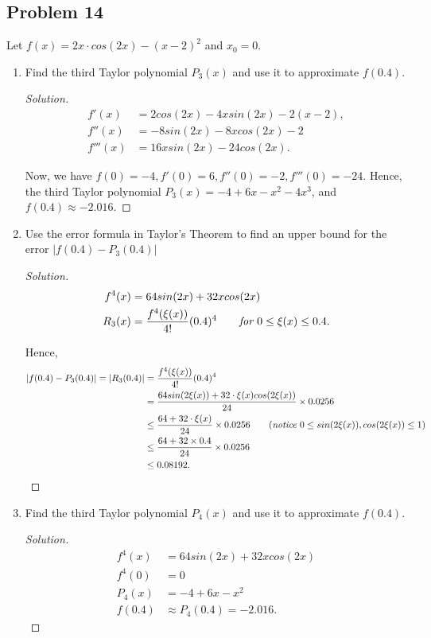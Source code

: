 \documentclass{article}
\begin{document}
\subsection*{Problem 14}
Let $f(x) = 2x\cdot cos(2x) - (x-2)^2$ and $x_0 = 0$.
\begin{enumerate}[label=(\alph*)]
    \item Find the third Taylor polynomial $P_3(x)$ and use it to approximate $f(0.4)$.
    \begin{proof}[Solution]
        \begin{align*}
            f'(x) & = 2cos(2x) - 4xsin(2x) - 2(x-2), \\
            f''(x) & = -8sin(2x) - 8xcos(2x) - 2 \\
            f'''(x) & = 16xsin(2x) - 24cos(2x).
        \end{align*}

        Now, we have $f(0) = -4, f'(0) = 6, f''(0) = -2, f'''(0) = -24$. Hence, the third Taylor 
        polynomial $P_3(x) = -4 + 6x -x^2 -4x^3$, and $f(0.4) \approx -2.016$.
    \end{proof}

    \item Use the error formula in Taylor's Theorem to find an upper bound for the error 
    $|f(0.4) - P_3(0.4)|$

    \begin{proof}[Solution]
        \begin{align*}
            f^4(x) & = 64sin(2x) + 32xcos(2x) \\
            R_3(x) & = \frac{f^4(\xi(x))}{4!}(0.4)^4 \qquad \emph{for } 0 \le \xi(x) \le 0.4.
        \end{align*}

        Hence, \begin{align*}
            |f(0.4) - P_3(0.4)| = |R_3(0.4)| & = \frac{f^4(\xi(x))}{4!}(0.4)^4 \\
            & = \frac{64sin(2\xi(x))+32\cdot \xi(x)cos(2\xi(x))}{24}\times 0.0256 \\
            & \le \frac{64+32\cdot \xi(x)}{24}\times 0.0256 \qquad (\emph{notice } 0 \le sin(2\xi(x)),
            cos(2\xi(x))\le 1)\\
            & \le \frac{64 + 32\times 0.4}{24}\times 0.0256 \\
            & \le 0.08192.
        \end{align*}
    \end{proof}

    \item Find the third Taylor polynomial $P_4(x)$ and use it to approximate $f(0.4)$.
    \begin{proof}[Solution]
        \begin{align*}
            f^4(x) & = 64sin(2x) + 32xcos(2x) \\
            f^4(0) & = 0 \\
            P_4(x) & = -4 + 6x -x^2 \\
            f(0.4) & \approx P_4(0.4) = -2.016.
        \end{align*}
    \end{proof}


\end{enumerate}
\end{document}
